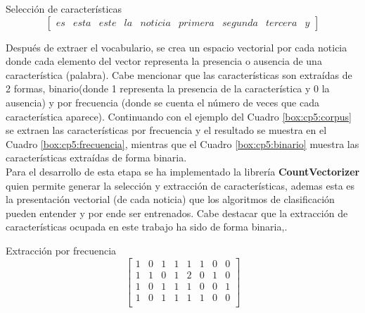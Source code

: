 \begin{mygraybox}[label={box:cp5:caracteristicas}]{Selección de características} 
\begin{equation*}
\begin{bmatrix}
es & esta & este & la & noticia & primera & segunda & tercera & y
\end{bmatrix}
\end{equation*}
\end{mygraybox}




Después de extraer el  vocabulario, se crea un espacio vectorial por cada noticia donde cada elemento del vector representa la presencia o ausencia de una característica (palabra). Cabe mencionar que las características son extraídas de 2 formas, binario(donde 1 representa la presencia de la característica y 0 la ausencia) y por frecuencia (donde se cuenta el número de veces que cada característica aparece). Continuando con el ejemplo del Cuadro \ref{box:cp5:corpus} se extraen las características por frecuencia y el resultado se muestra en el Cuadro \ref{box:cp5:frecuencia}, mientras que el Cuadro \ref{box:cp5:binario} muestra las características extraídas de forma binaria.\\

Para el desarrollo de esta etapa se ha implementado la librería \textbf{CountVectorizer} quien permite generar la selección y extracción de características, ademas esta es la presentación vectorial (de cada noticia) que los algoritmos de clasificación pueden entender y por ende ser entrenados. Cabe destacar que la extracción de características ocupada en este trabajo ha sido de forma binaria,.\\

\begin{mygraybox}[label={box:cp5:frecuencia}]{Extracción por frecuencia} 
\begin{equation*}
\begin{bmatrix}
1 & 0 & 1 & 1 & 1 & 1 & 0 & 0\\ 
1 & 1 & 0 & 1 & 2 & 0 & 1 & 0\\
1 & 0 & 1 & 1 & 1 & 0 & 0 & 1\\
1 & 0 & 1 & 1 & 1 & 1 & 0 & 0\\
\end{bmatrix}
\end{equation*}
\end{mygraybox}

\ \\

